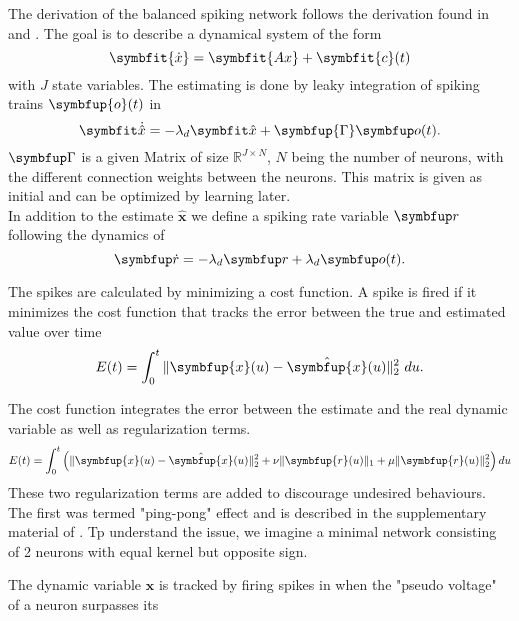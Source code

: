 The derivation of the balanced spiking network follows the derivation found in \cite{boerlin_predictive_2013} and \cite{huang_dynamics_2019}.
The goal is to describe a dynamical system of the form
\begin{equation}
	\symbfit{\dot{x}} = \symbfit{Ax} + \symbfit{c}(t)
\end{equation}
with $J$ state variables.
The estimating is done by leaky integration of spiking trains $\symbfup{o}(t)$ in
\begin{equation}
	\bm{\dot{\hat{x}}} = -\lambda_d \bm{\hat{x}} + \symbfup{\Gamma} \bmu{o}(t).
\end{equation}
$\bmu{\Gamma}$ is a given Matrix of size $\mathbb{R}^{J\times N}$, $N$ being the number of neurons, with the different connection weights between the neurons. This matrix is given as initial and can be optimized by learning later.\\
In addition to the estimate $\bm{\hat{x}}$ we define a spiking rate variable $\bmu{r}$ following the dynamics of
\begin{equation}
	\bmu{\dot{r}} = -\lambda_d\bmu{r} + \lambda_d \bmu{o}(t).
\end{equation}

The spikes are calculated by minimizing a cost function. A spike is fired if it minimizes the cost function that tracks the error between the true and estimated value over time
\begin{equation}
E(t)=\int_0^t \|\symbfup{x}(u)-\hat{\symbfup{x}}(u)\|_2^2 \ du.
\end{equation}

The cost function integrates the error between the estimate and the real dynamic variable as well as regularization terms.
\begin{equation}
E(t)=\int_0^t \left(\|\symbfup{x}(u)-\hat{\symbfup{x}}(u)\|_2^2+\nu\|\symbfup{r}(u)\|_1+\mu\|\symbfup{r}(u)\|_2^2\right)d u
\end{equation}
These two regularization terms are added to discourage undesired behaviours.\\
The first was termed "ping-pong" effect and is described in the supplementary material of \cite{boerlin_predictive_2013}. Tp understand the issue, we imagine a minimal network consisting of 2 neurons with equal kernel but opposite sign.



The dynamic variable $\bm{x}$ is tracked by firing spikes in when the "pseudo voltage" of a neuron surpasses its



